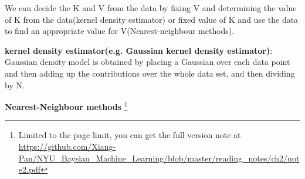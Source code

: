 \documentclass{article}
\begin{document}
We can decide the K and V from the data by fixing V and determining the value of K from the data(kernel density estimator) or ﬁxed value of K and use the data to ﬁnd an appropriate value for V(Nearest-neighbour methods).

\textbf{kernel density estimator(e.g. Gaussian kernel density estimator)}: Gaussian density model is obtained by placing a Gaussian over each data point and then adding up the contributions over the whole data set, and then dividing by N.

\textbf{Nearest-Neighbour methods}
\footnote{Limited to the page limit, you can get the full version note at \url{https://github.com/Xiang-Pan/NYU_Baysian_Machine_Learning/blob/master/reading_notes/ch2/note2.pdf} }









\end{document}

